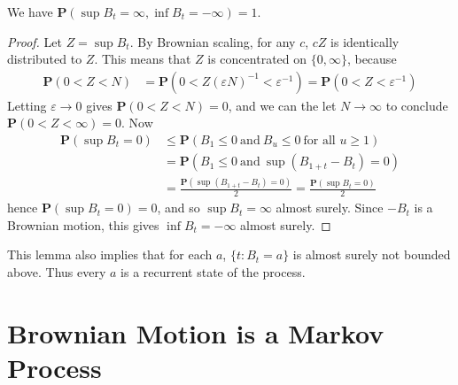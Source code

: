 \begin{lemma}
    We have $\mathbf{P} \left( \sup B_t = \infty, \inf B_t = -\infty \right) = 1$.
\end{lemma}
\begin{proof}
    Let $Z = \sup B_t$. By Brownian scaling, for any $c$, $cZ$ is identically distributed to $Z$. This means that $Z$ is concentrated on $\{ 0, \infty \}$, because
    \begin{align*}
        \mathbf{P}(0 < Z < N) &= \mathbf{P}\left(0 < Z(\varepsilon N)^{-1} < \varepsilon^{-1} \right) = \mathbf{P}(0 < Z < \varepsilon^{-1})
    \end{align*}
    Letting $\varepsilon \to 0$ gives $\mathbf{P}(0 < Z < N) = 0$, and we can the let $N \to \infty$ to conclude $\mathbf{P}(0 < Z < \infty) = 0$. Now
    \begin{align*}
        \mathbf{P}(\sup B_t = 0) &\leq \mathbf{P}(B_1 \leq 0\ \text{and}\ B_u \leq 0\ \text{for all $u \geq 1$})\\
        &= \mathbf{P}(B_1 \leq 0\ \text{and}\ \sup(B_{1 + t} - B_t) = 0)\\
        &= \frac{\mathbf{P}(\sup(B_{1+t} - B_t) = 0)}{2} = \frac{\mathbf{P}(\sup B_t = 0)}{2}
    \end{align*}
    hence $\mathbf{P}(\sup B_t = 0) = 0$, and so $\sup B_t = \infty$ almost surely. Since $-B_t$ is a Brownian motion, this gives $\inf B_t = -\infty$ almost surely.
\end{proof}

This lemma also implies that for each $a$, $\{ t: B_t = a \}$ is almost surely not bounded above. Thus every $a$ is a recurrent state of the process.

\section{Brownian Motion is a Markov Process}

